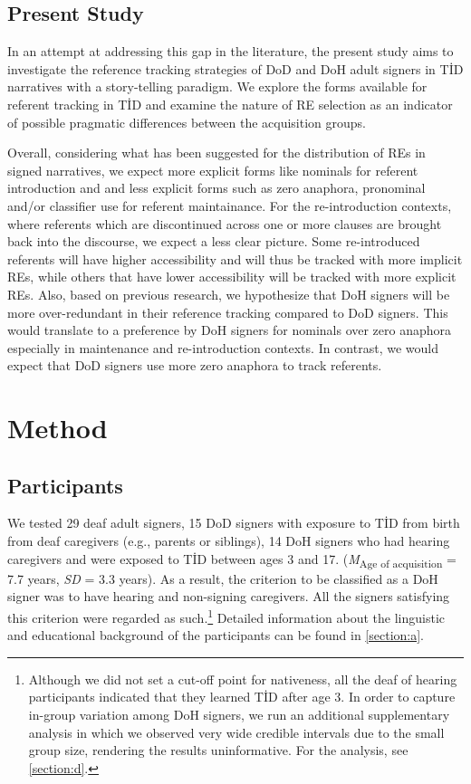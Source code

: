 \documentclass[review]{elsarticle} %
\begin{document}
\hypertarget{present-study}{%
\subsection{Present Study}\label{present-study}}

In an attempt at addressing this gap in the literature, the present
study aims to investigate the reference tracking strategies of DoD and
DoH adult signers in TİD narratives with a story-telling paradigm. We
explore the forms available for referent tracking in TİD and examine the
nature of RE selection as an indicator of possible pragmatic differences
between the acquisition groups.

Overall, considering what has been suggested for the distribution of REs
in signed narratives, we expect more explicit forms like nominals for
referent introduction and and less explicit forms such as zero anaphora,
pronominal and/or classifier use for referent maintainance. For the
re-introduction contexts, where referents which are discontinued across
one or more clauses are brought back into the discourse, we expect a
less clear picture. Some re-introduced referents will have higher
accessibility and will thus be tracked with more implicit REs, while
others that have lower accessibility will be tracked with more explicit
REs. Also, based on previous research, we hypothesize that DoH signers
will be more over-redundant in their reference tracking compared to DoD
signers. This would translate to a preference by DoH signers for
nominals over zero anaphora especially in maintenance and
re-introduction contexts. In contrast, we would expect that DoD signers
use more zero anaphora to track referents.

\hypertarget{method}{%
\section{Method}\label{method}}

\hypertarget{participants}{%
\subsection{Participants}\label{participants}}

We tested 29 deaf adult signers, 15 DoD signers with exposure to TİD
from birth from deaf caregivers (e.g., parents or siblings), 14 DoH
signers who had hearing caregivers and were exposed to TİD between ages
3 and 17. (\emph{M}\textsubscript{Age of acquisition} = 7.7 years,
\emph{SD} = 3.3 years). As a result, the criterion to be classified as a
DoH signer was to have hearing and non-signing caregivers. All the
signers satisfying this criterion were regarded as
such.\footnote{Although we did not set a cut-off point for nativeness, all the deaf of hearing participants indicated that they learned TİD after age 3. In order to capture in-group variation among DoH signers, we run an additional supplementary analysis in which we observed very wide credible intervals due to the small group size, rendering the results uninformative. For the analysis, see \ref{section:d}.}
Detailed information about the linguistic and educational background of
the participants can be found in \ref{section:a}.
\end{document}
